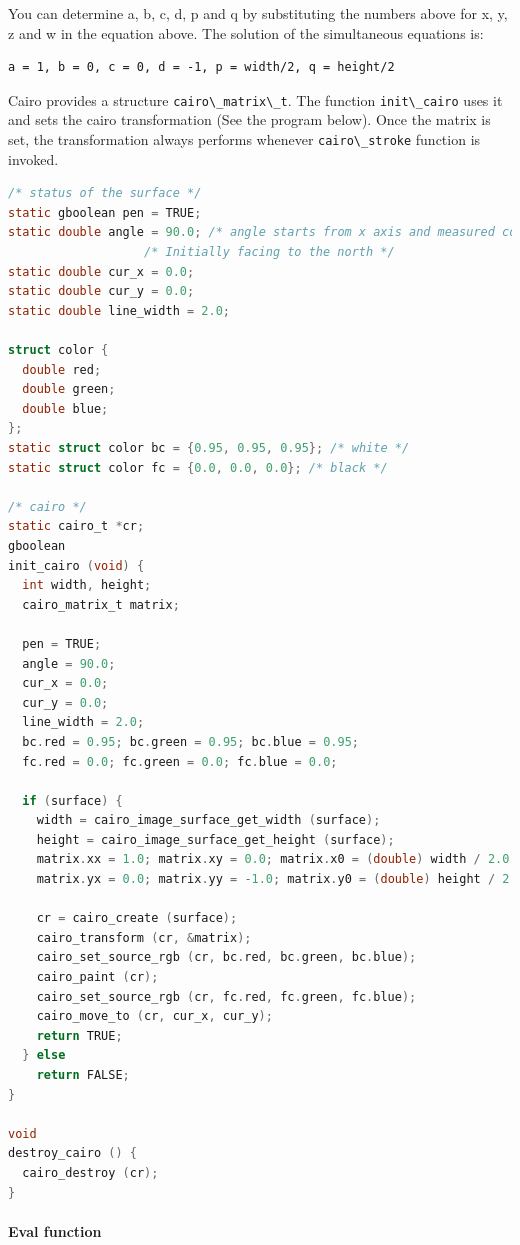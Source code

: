 You can determine a, b, c, d, p and q by substituting the numbers above
for x, y, z and w in the equation above. The solution of the
simultaneous equations is:

\begin{lstlisting}
a = 1, b = 0, c = 0, d = -1, p = width/2, q = height/2
\end{lstlisting}

Cairo provides a structure \passthrough{\lstinline!cairo\_matrix\_t!}.
The function \passthrough{\lstinline!init\_cairo!} uses it and sets the
cairo transformation (See the program below). Once the matrix is set,
the transformation always performs whenever
\passthrough{\lstinline!cairo\_stroke!} function is invoked.

\begin{lstlisting}[language=C]
/* status of the surface */
static gboolean pen = TRUE;
static double angle = 90.0; /* angle starts from x axis and measured counterclockwise */
                   /* Initially facing to the north */
static double cur_x = 0.0;
static double cur_y = 0.0;
static double line_width = 2.0;

struct color {
  double red;
  double green;
  double blue;
};
static struct color bc = {0.95, 0.95, 0.95}; /* white */
static struct color fc = {0.0, 0.0, 0.0}; /* black */

/* cairo */
static cairo_t *cr;
gboolean
init_cairo (void) {
  int width, height;
  cairo_matrix_t matrix;

  pen = TRUE;
  angle = 90.0;
  cur_x = 0.0;
  cur_y = 0.0;
  line_width = 2.0;
  bc.red = 0.95; bc.green = 0.95; bc.blue = 0.95;
  fc.red = 0.0; fc.green = 0.0; fc.blue = 0.0;

  if (surface) {
    width = cairo_image_surface_get_width (surface);
    height = cairo_image_surface_get_height (surface);
    matrix.xx = 1.0; matrix.xy = 0.0; matrix.x0 = (double) width / 2.0;
    matrix.yx = 0.0; matrix.yy = -1.0; matrix.y0 = (double) height / 2.0;

    cr = cairo_create (surface);
    cairo_transform (cr, &matrix);
    cairo_set_source_rgb (cr, bc.red, bc.green, bc.blue);
    cairo_paint (cr);
    cairo_set_source_rgb (cr, fc.red, fc.green, fc.blue);
    cairo_move_to (cr, cur_x, cur_y);
    return TRUE;
  } else
    return FALSE;
}

void
destroy_cairo () {
  cairo_destroy (cr);
}
\end{lstlisting}

\paragraph{Eval function}\label{eval-function}

